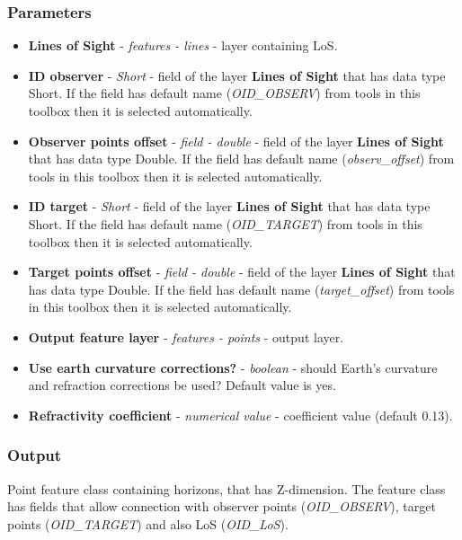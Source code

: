 \documentclass[]{article}
\begin{document}
\subsubsection{Parameters}
\begin{itemize}
	\item \textbf{Lines of Sight} - \textit{features - lines} - layer containing LoS.
	\item \textbf{ID observer} - \textit{Short} - field of the layer \textbf{Lines of Sight} that has data type Short. If the field has default name (\textit{OID\_OBSERV}) from tools in this toolbox then it is selected automatically.
	\item \textbf{Observer points offset} - \textit{field - double} - field of the layer \textbf{Lines of Sight} that has data type Double. If the field has default name (\textit{observ\_offset}) from tools in this toolbox then it is selected automatically.
	\item \textbf{ID target} - \textit{Short} - field of the layer \textbf{Lines of Sight} that has data type Short. If the field has default name (\textit{OID\_TARGET}) from tools in this toolbox then it is selected automatically.
	\item \textbf{Target points offset} - \textit{field - double} - field of the layer \textbf{Lines of Sight} that has data type Double. If the field has default name (\textit{target\_offset}) from tools in this toolbox then it is selected automatically.
	\item \textbf{Output feature layer} - \textit{features - points} - output layer.
	\item \textbf{Use earth curvature corrections?} - \textit{boolean} - should Earth's curvature and refraction corrections be used? Default value is yes.
	\item \textbf{Refractivity coefficient} - \textit{numerical value}  - coefficient value (default 0.13).
\end{itemize}

\subsubsection{Output}

Point feature class containing horizons, that has Z-dimension. The feature class has fields that allow connection with observer points (\textit{OID\_OBSERV}), target points (\textit{OID\_TARGET}) and also LoS (\textit{OID\_LoS}). 
\end{document}
